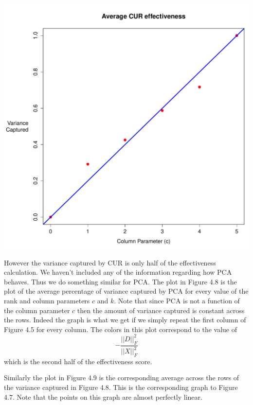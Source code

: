 \documentclass{book}
\begin{document}
\begin{center}
\includegraphics[scale=.43]{./Figures/diag_ex_1_cur_effect_avg.pdf}%
\end{center}

However the variance captured by CUR is only half of the effectiveness calculation. We haven't included any of the information regarding how PCA behaves. Thus we do something similar for PCA. The plot in Figure 4.8 is the plot of the average percentage of variance captured by PCA for every value of the rank and column parameters $c$ and $k$. Note that since PCA is not a function of the column parameter $c$ then the amount of variance captured is constant across the rows. Indeed the graph is what we get if we simply repeat the first column of Figure 4.5 for every column. The colors in this plot correspond to the value of
$$
-\frac{||D||_F^2}{||X||_F^2}
$$
which is the second half of the effectiveness score.  

Similarly the plot in Figure 4.9 is the corresponding average across the rows of the variance captured in Figure 4.8. This is the corresponding graph to Figure 4.7. Note that the points on this graph are almost perfectly linear. 
\end{document}
